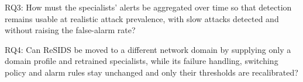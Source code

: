 RQ3: How must the specialists' alerts be aggregated over time so that detection remains
usable at realistic attack prevalence, with slow attacks detected and without raising the
false-alarm rate?

RQ4: Can ReSIDS be moved to a different network domain by supplying only a domain profile
and retrained specialists, while its failure handling, switching policy and alarm rules
stay unchanged and only their thresholds are recalibrated?
